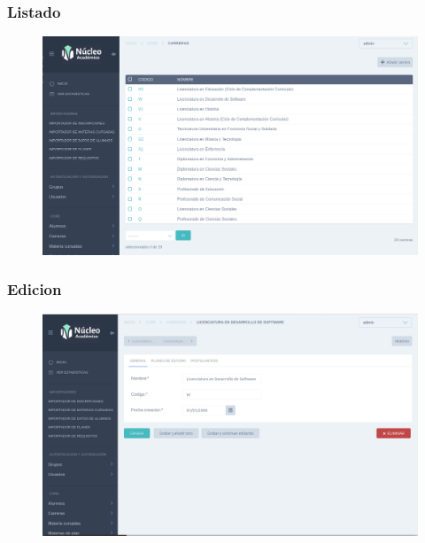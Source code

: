 \subsubsection{Listado}
\begin{figure}[h!]
  \centering
    \includegraphics[scale=0.3]{images/nucleo/nucleo-list.png}
  \label{fig:django}
\end{figure}

\subsubsection{Edicion}
\begin{figure}[h!]
  \centering
    \includegraphics[scale=0.3]{images/nucleo/nucleo-edit.png}
  \label{fig:django}
\end{figure}


















